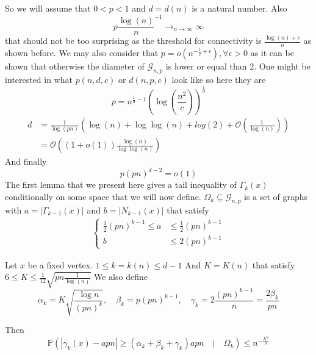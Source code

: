 So we will assume that $0 < p < 1$ and $d=d(n)$ is a natural number.
Also 
\begin{equation}
	p \frac{\log(n)}{n}^{-1} \longrightarrow_{n \to \infty} \infty
\end{equation}
that should not be too surprising as the threshold for connectivity is $\frac{\log(n) + c}{n}$ as shown before.
We may also consider that $p = o(n^{-\frac{1}{2} +\epsilon}), \forall \epsilon > 0$ as it can be shown that otherwise the diameter of $\mathcal{G}_{n,p}$ is lower or equal than 2. One might be interested in what $p(n, d, c)$ or $d(n , p, c)$ look like so here they are
\begin{equation}
	p=n^{\frac{1}{d} - 1}(\log(\frac{n^2}{c}))^\frac{1}{d}
\end{equation}
\begin{align}
	d &= \frac{1}{\log(pn)}(\log(n) + \log \log (n) + log(2) + \mathcal{O}(\frac{1}{\log(n)}))\\
	  &= \mathcal{O}((1+o(1))\frac{\log(n)}{\log\log(n)})
\end{align}
And finally
\begin{equation}
	p(pn)^{d-2} = o(1)
\end{equation}
The first lemma that we present here gives a tail inequality of $\Gamma_k(x)$ conditionally on some space that we will now define. $\Omega_k \subseteq \mathcal{G}_{n, p}$ is a set of graphs with $a = |\Gamma_{k-1}(x)|$ and $b = |N_{k-1}(x)|$ that satisfy
\begin{align}
 \left\{\begin{array}{rl}
		 \frac{1}{2}(pn)^{k-1} \leq a &\leq \frac{1}{2}(pn)^{k-1} \\
		 			    b &\leq 2(pn)^{k-1}
	 \end{array}
	\right.
\end{align}
\begin{lemma}
	Let $x$ be a fixed vertex.
	\newline
	$1 \leq k = k(n)  \leq d-1$
	\newline
	And $ K = K(n)$ that satisfy $ 6 \leq K \leq \frac{1}{12} \sqrt{pn\frac{1}{\log(n)}}$
	We also define
	\begin{equation}
		\alpha_k = K\sqrt{\frac{\log{n}}{(pn)^k}} , \quad \beta_k = p(pn)^{k-1}, \quad \gamma_k = 2\frac{(pn)^{k-1}}{n} = \frac{2\beta_k}{pn}
	\end{equation}

	Then
	\begin{equation}
		\mathbb{P}(|\gamma_k(x) - apn| \geq (\alpha_k + \beta_k + \gamma_k)apn \quad|\quad \Omega_k) \leq n^{-\frac{K^2}{9}}
	\end{equation}
\end{lemma}

